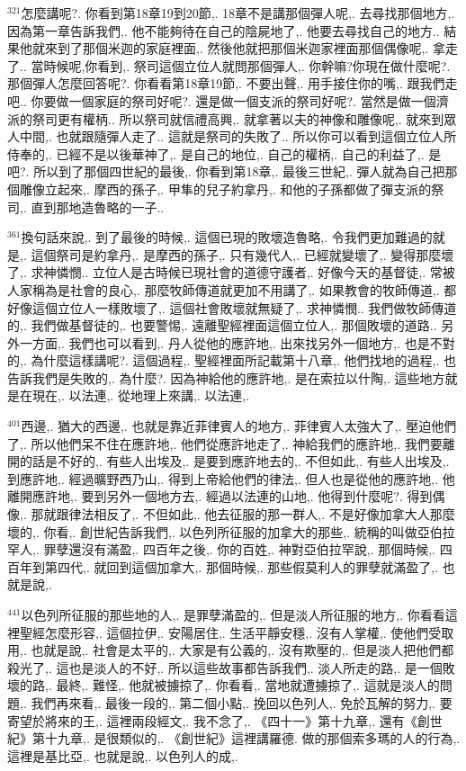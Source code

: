 \documentclass{book}
\begin{document}
$^{321}$怎麼講呢?.
你看到第18章19到20節,.
18章不是講那個彈人呢,.
去尋找那個地方,.
因為第一章告訴我們,.
他不能夠待在自己的陰屍地了,.
他要去尋找自己的地方..
結果他就來到了那個米迦的家庭裡面,.
然後他就把那個米迦家裡面那個偶像呢,.
拿走了..
當時候呢,你看到,.
祭司這個立位人就問那個彈人,.
你幹嘛?你現在做什麼呢?.
那個彈人怎麼回答呢?.
你看看第18章19節,.
不要出聲,.
用手接住你的嘴,.
跟我們走吧..
你要做一個家庭的祭司好呢?.
還是做一個支派的祭司好呢?.
當然是做一個濟派的祭司更有權柄..
所以祭司就信禮高興,.
就拿著以夫的神像和雕像呢,.
就來到眾人中間,.
也就跟隨彈人走了..
這就是祭司的失敗了..
所以你可以看到這個立位人所侍奉的,.
已經不是以後華神了,.
是自己的地位,.
自己的權柄,.
自己的利益了,.
是吧?.
所以到了那個四世紀的最後,.
你看到第18章,.
最後三世紀,.
彈人就為自己把那個雕像立起來,.
摩西的孫子,.
甲隼的兒子約拿丹,.
和他的子孫都做了彈支派的祭司,.
直到那地造魯略的一子..

$^{361}$換句話來說,.
到了最後的時候,.
這個已現的敗壞造魯略,.
令我們更加難過的就是,.
這個祭司是約拿丹,.
是摩西的孫子,.
只有幾代人,.
已經就變壞了,.
變得那麼壞了,.
求神憐憫..
立位人是古時候已現社會的道德守護者,.
好像今天的基督徒,.
常被人家稱為是社會的良心,.
那麼牧師傳道就更加不用講了,.
如果教會的牧師傳道,.
都好像這個立位人一樣敗壞了,.
這個社會敗壞就無疑了,.
求神憐憫..
我們做牧師傳道的,.
我們做基督徒的,.
也要警惕,.
遠離聖經裡面這個立位人,.
那個敗壞的道路..
另外一方面,.
我們也可以看到,.
丹人從他的應許地,.
出來找另外一個地方,.
也是不對的,.
為什麼這樣講呢?.
這個過程,.
聖經裡面所記載第十八章,.
他們找地的過程,.
也告訴我們是失敗的,.
為什麼?.
因為神給他的應許地,.
是在索拉以什陶,.
這些地方就是在現在,.
以法連,.
從地理上來講,.
以法連,.

$^{401}$西邊,.
猶大的西邊,.
也就是靠近菲律賓人的地方,.
菲律賓人太強大了,.
壓迫他們了,.
所以他們呆不住在應許地,.
他們從應許地走了,.
神給我們的應許地,.
我們要離開的話是不好的,.
有些人出埃及,.
是要到應許地去的,.
不但如此,.
有些人出埃及,.
到應許地,.
經過曠野西乃山,.
得到上帝給他們的律法,.
但人也是從他的應許地,.
他離開應許地,.
要到另外一個地方去,.
經過以法連的山地,.
他得到什麼呢?.
得到偶像,.
那就跟律法相反了,.
不但如此,.
他去征服的那一群人,.
不是好像加拿大人那麼壞的,.
你看,.
創世紀告訴我們,.
以色列所征服的加拿大的那些,.
統稱的叫做亞伯拉罕人,.
罪孽還沒有滿盈,.
四百年之後,.
你的百姓,.
神對亞伯拉罕說,.
那個時候,.
四百年到第四代,.
就回到這個加拿大,.
那個時候,.
那些假莫利人的罪孽就滿盈了,.
也就是說,.

$^{441}$以色列所征服的那些地的人,.
是罪孽滿盈的,.
但是淡人所征服的地方,.
你看看這裡聖經怎麼形容,.
這個拉伊,.
安陽居住,.
生活平靜安穩,.
沒有人掌權,.
使他們受取用,.
也就是說,.
社會是太平的,.
大家是有公義的,.
沒有欺壓的,.
但是淡人把他們都殺光了,.
這也是淡人的不好,.
所以這些故事都告訴我們,.
淡人所走的路,.
是一個敗壞的路,.
最終,.
難怪,.
他就被擄掠了,.
你看看,.
當地就遭擄掠了,.
這就是淡人的問題,.
我們再來看,.
最後一段的,.
第二個小點,.
挽回以色列人,.
免於瓦解的努力,.
要寄望於將來的王,.
這裡兩段經文,.
我不念了,.
《四十一》第十九章,.
還有《創世紀》第十九章,.
是很類似的,.
《創世紀》這裡講羅德.
做的那個索多瑪的人的行為,.
這裡是基比亞,.
也就是說,.
以色列人的成,.
\end{document}
